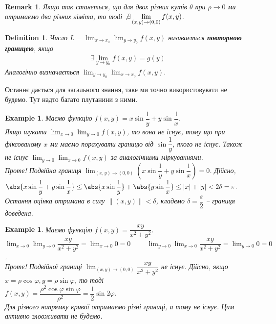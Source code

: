 \documentclass[a4paper, 10pt]{article}
\def\huge{\displaystyle}
\theoremstyle{theoremdd}
\theoremstyle{theoremdd}
\theoremstyle{theoremdd}
\newtheorem{definition}[theorem]{Definition}
\theoremstyle{theoremdd}
\theoremstyle{theoremdd}
\newtheorem{example}[theorem]{Example}
\theoremstyle{theoremdd}
\theoremstyle{theoremdd}
\newtheorem{remark}[theorem]{Remark}
\theoremstyle{theoremdd}
\theoremstyle{theoremdd}
\newcommand\Norm[1]{\|#1\|}
\begin{document}
\begin{remark}
Якщо так станеться, що для двох різних кутів $\theta$ при $\rho \to 0$ ми отримаємо два різних ліміта, то тоді $\not\exists \huge\lim_{(x,y) \to (0,0)} f(x,y)$.
\end{remark}

\begin{definition}
Число $L = \huge\lim_{x \to x_0} \lim_{y \to y_0} f(x,y)$ називається \textbf{повторною границею}, якщо
\begin{align*}
\exists \huge\lim_{y \to y_0} f(x,y) = g(y)
\end{align*}
Аналогічно визначається $\huge\lim_{y \to y_0} \lim_{x \to x_0} f(x,y)$.
\end{definition}
Останнє дається для загального знання, таке ми точно використовувати не будемо. Тут надто багато плутанини з ними.

\begin{example}
Маємо функцію $f(x,y) = x \sin \dfrac{1}{y} + y \sin \dfrac{1}{x}$.\\
Якщо шукати $\huge\lim_{x \to 0} \lim_{y \to 0} f(x,y)$, то вона не існує, тому що при фіксованому $x$ ми маємо порахувати границю від $\sin \dfrac{1}{y}$, якого не існує. Також не існує $\huge\lim_{y \to 0} \lim_{x \to 0} f(x,y)$ за аналогічними міркуваннями.\\
Проте! Подвійна границя $\huge\lim_{(x,y) \to (0,0)} \left( x \sin \dfrac{1}{y} + y \sin \dfrac{1}{x} \right) = 0$. Дійсно,\\
$\abs{x \sin \dfrac{1}{y} + y \sin \dfrac{1}{x}} \leq \abs{x \sin \dfrac{1}{y}} + \abs{y \sin \dfrac{1}{x}} \leq |x| + |y| < 2 \delta = \varepsilon$.\\
Остання оцінка отримана в силу $\Norm{(x,y)} < \delta$, кладемо $\delta = \dfrac{\varepsilon}{2}$ -- границя доведена.
\end{example}

\begin{example}
Маємо функцію $f(x,y) = \dfrac{xy}{x^2+y^2}$.\\
$\huge\lim_{x \to 0} \lim_{y \to 0} \dfrac{xy}{x^2+y^2} = \lim_{x \to 0} 0 = 0 \hspace{1cm} \huge\lim_{y \to 0} \lim_{x \to 0} \dfrac{xy}{x^2+y^2} = \lim_{y \to 0} 0 = 0$.\\
Проте! Подвійної границі $\huge\lim_{(x,y) \to (0,0)} \dfrac{xy}{x^2+y^2}$ не існує. Дійсно, якщо $x = \rho \cos \varphi, y = \rho \sin \varphi$, то тоді\\
$f(x,y) = \dfrac{\rho^2 \cos \varphi \sin \varphi}{\rho^2} = \dfrac{1}{2} \sin 2 \varphi$.\\
Для різного напрямку кривої отримаємо різні границі, а тому не існує. Цим активно зловживати не будемо.
\end{example}
\end{document}
